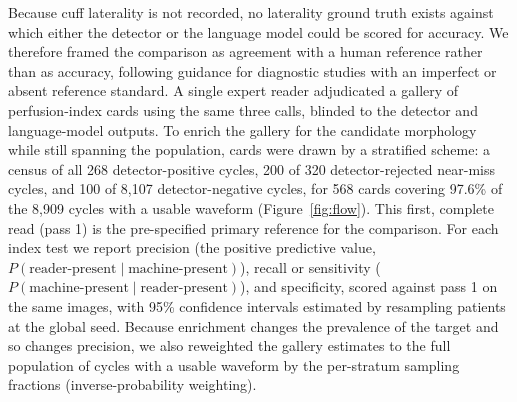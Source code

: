 \documentclass[twocolumn,letterpaper,10pt]{article}
\begin{document}
Because cuff laterality is not recorded, no laterality ground truth exists against which either the detector or the language model could be scored for accuracy. We therefore framed the comparison as agreement with a human reference rather than as accuracy, following guidance for diagnostic studies with an imperfect or absent reference standard.\cite{reitsma2009_imperfect_reference,rutjes2007_no_gold_standard,bossuyt2015_stard} A single expert reader adjudicated a gallery of perfusion-index cards using the same three calls, blinded to the detector and language-model outputs. To enrich the gallery for the candidate morphology while still spanning the population, cards were drawn by a stratified scheme: a census of all 268 detector-positive cycles, 200 of 320 detector-rejected near-miss cycles, and 100 of 8{,}107 detector-negative cycles, for 568 cards covering 97.6\% of the 8{,}909 cycles with a usable waveform (Figure~\ref{fig:flow}). This first, complete read (pass 1) is the pre-specified primary reference for the comparison. For each index test we report precision (the positive predictive value, $P(\text{reader-present}\mid\text{machine-present})$), recall or sensitivity ($P(\text{machine-present}\mid\text{reader-present})$), and specificity, scored against pass 1 on the same images, with 95\% confidence intervals estimated by resampling patients at the global seed. Because enrichment changes the prevalence of the target and so changes precision,\cite{begg1983_verification_bias,ransohoff1978_spectrum_bias} we also reweighted the gallery estimates to the full population of cycles with a usable waveform by the per-stratum sampling fractions (inverse-probability weighting).
\end{document}
